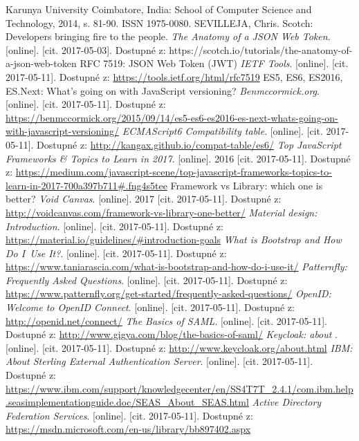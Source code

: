 \begin{thebibliography}{99}
Karunya University Coimbatore, India: School of Computer Science and Technology, 2014, s. 81-90. ISSN 1975-0080.
SEVILLEJA, Chris.
Scotch: Developers bringing fire to the people. \textit{The Anatomy of a JSON Web Token}.
[online]. [cit. 2017-05-03]. Dostupné z: https://scotch.io/tutorials/the-anatomy-of-a-json-web-token
RFC 7519: JSON Web Token (JWT)
\textit{IETF Tools}.
[online]. [cit. 2017-05-11]. Dostupné z: \url{https://tools.ietf.org/html/rfc7519}
ES5, ES6, ES2016, ES.Next: What's going on with JavaScript versioning?
\textit{Benmccormick.org}.
[online]. [cit. 2017-05-11]. Dostupné z: \url{https://benmccormick.org/2015/09/14/es5-es6-es2016-es-next-whats-going-on-with-javascript-versioning/}
\textit{ECMAScript6 Compatibility table}.
[online]. [cit. 2017-05-11]. Dostupné z: \url{http://kangax.github.io/compat-table/es6/}
\textit{Top JavaScript Frameworks \& Topics to Learn in 2017}.
[online]. 2016 [cit. 2017-05-11].  Dostupné z:  \url{https://medium.com/javascript-scene/top-javascript-frameworks-topics-to-learn-in-2017-700a397b711#.fng4s5tee}
Framework vs Library: which one is better?
\textit{Void Canvas}.
[online]. 2017 [cit. 2017-05-11]. Dostupné z: \url{http://voidcanvas.com/framework-vs-library-one-better/}
\textit{Material design: Introduction}.
[online]. [cit. 2017-05-11]. Dostupné z: \url{https://material.io/guidelines/#introduction-goals}
\textit{What is Bootstrap and How Do I~Use It?}.
[online]. [cit. 2017-05-11]. Dostupné z: \url{https://www.taniarascia.com/what-is-bootstrap-and-how-do-i-use-it/}
\textit{Patternfly: Frequently Asked Questions}.
[online]. [cit. 2017-05-11]. Dostupné z: \url{https://www.patternfly.org/get-started/frequently-asked-questions/}
\textit{OpenID: Welcome to OpenID Connect}.
[online]. [cit. 2017-05-11]. Dostupné z: \url{http://openid.net/connect/}
\textit{The Basics of SAML}.
[online]. [cit. 2017-05-11]. Dostupné z: \url{http://www.gigya.com/blog/the-basics-of-saml/}
\textit{Keycloak: about }.
[online]. [cit. 2017-05-11]. Dostupné z: \url{http://www.keycloak.org/about.html}
\textit{IBM: About Sterling External Authentication Server}.
[online]. [cit. 2017-05-11]. Dostupné z: \url{https://www.ibm.com/support/knowledgecenter/en/SS4T7T_2.4.1/com.ibm.help.seasimplementationguide.doc/SEAS_About_SEAS.html}
\textit{Active Directory Federation Services}.
[online]. [cit. 2017-05-11]. Dostupné z: \url{https://msdn.microsoft.com/en-us/library/bb897402.aspx}

\end{thebibliography}

